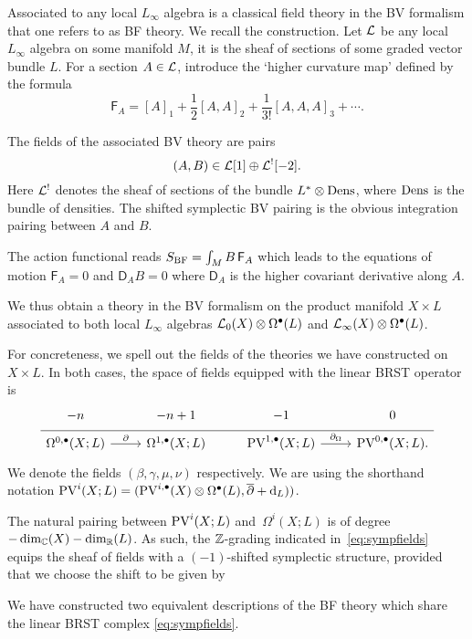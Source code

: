 \documentclass[11pt]{amsart}
\begin{document}
Associated to any local $L_\infty$ algebra is a classical field theory in the BV formalism that one refers to as BF theory.
We recall the construction. 
Let $\mathcal L$ be any local $L_\infty$ algebra on some manifold $M$, it is the sheaf of sections of some graded vector bundle $L$. 
For a section $A \in \mathcal L$, introduce the `higher curvature map' defined by the formula
\[
\mathsf{F}_A = [A]_1 + \frac12 [A,A]_2 + \frac{1}{3!} [A,A,A]_3 + \cdots .
\]

The fields of the associated BV theory are pairs
\[
  (A, B) \in \mathcal L[1] \oplus \mathcal L^{!}[-2] .
\]
Here $\mathcal L^!$ denotes the sheaf of sections of the bundle $L^* \otimes {\rm Dens}$, where ${\rm Dens}$ is the bundle of densities. 
The shifted symplectic BV pairing is the obvious integration pairing between $A$ and $B$. 

The action functional reads $S_{\rm BF} = \int_M B \, \mathsf{F}_{A}$ which leads to the equations of motion $\mathsf{F}_{A} = 0$ and $\mathsf{D}_A B= 0$ where $\mathsf{D}_A$ is the higher covariant derivative along $A$. 

We thus obtain a theory in the BV formalism on the product manifold $X \times L$ associated to both local $L_\infty$ algebras $\mathcal L_0(X) \otimes \Omega^{\bullet}(L)$ and $\mathcal L_\infty(X) \otimes \Omega^\bullet(L)$.

\parsec
For concreteness, we spell out the fields of the theories we have constructed on $X \times L$.
In both cases, the space of fields equipped with the linear BRST operator is
\begin{equation}
  \label{eq:sympfields} 
  \begin{tikzcd}[row sep = 1 ex]
    -n & -n + 1 & -1 & 0 \\ \hline
    \Omega^{0,\bu}(X;L) \ar[r, "\del"] & \Omega^{1,\bu}(X;L) & 
     \PV^{1,\bu}(X; L) \ar[r, "\div"] & \PV^{0,\bu}(X; L).
\end{tikzcd}
\end{equation}
We denote the fields $(\beta,\gamma,\mu,\nu)$ respectively.
We are using the shorthand notation ${\rm PV}^{i}(X;L) = ({\rm PV}^{i,\bullet}(X)\otimes \Omega^\bullet(L), \overline{\partial} + {\rm d}_{L}))$.

The natural pairing between ${\rm PV}^i(X;L)$ and~$\Omega^i(X;L)$ is of degree $-\dim_{\mathbb{C}}(X) -\dim_{\mathbb{R}}(L)$. 
As such, the $\mathbb{Z}$-grading indicated in~\eqref{eq:sympfields} equips the sheaf of fields with a $(-1)$-shifted symplectic structure, provided that we choose the shift to be given by

We have constructed two equivalent descriptions of the BF theory which share the linear BRST complex \eqref{eq:sympfields}.
\end{document}
